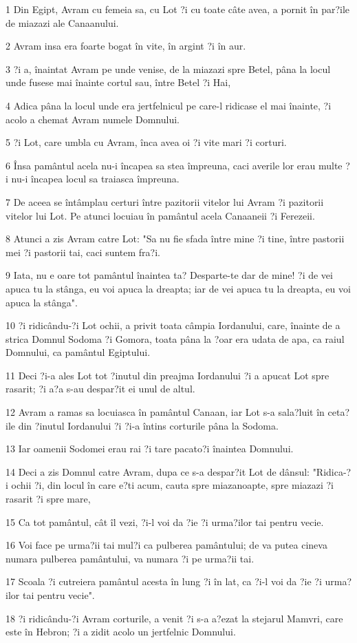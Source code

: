 \par 1 Din Egipt, Avram cu femeia sa, cu Lot ?i cu toate câte avea, a pornit în par?ile de miazazi ale Canaanului.
\par 2 Avram insa era foarte bogat în vite, în argint ?i în aur.
\par 3 ?i a, înaintat Avram pe unde venise, de la miazazi spre Betel, pâna la locul unde fusese mai înainte cortul sau, între Betel ?i Hai,
\par 4 Adica pâna la locul unde era jertfelnicul pe care-l ridicase el mai înainte, ?i acolo a chemat Avram numele Domnului.
\par 5 ?i Lot, care umbla cu Avram, înca avea oi ?i vite mari ?i corturi.
\par 6 Însa pamântul acela nu-i încapea sa stea împreuna, caci averile lor erau multe ?i nu-i încapea locul sa traiasca împreuna.
\par 7 De aceea se întâmplau certuri între pazitorii vitelor lui Avram ?i pazitorii vitelor lui Lot. Pe atunci locuiau în pamântul acela Canaaneii ?i Ferezeii.
\par 8 Atunci a zis Avram catre Lot: "Sa nu fie sfada între mine ?i tine, între pastorii mei ?i pastorii tai, caci suntem fra?i.
\par 9 Iata, nu e oare tot pamântul înaintea ta? Desparte-te dar de mine! ?i de vei apuca tu la stânga, eu voi apuca la dreapta; iar de vei apuca tu la dreapta, eu voi apuca la stânga".
\par 10 ?i ridicându-?i Lot ochii, a privit toata câmpia Iordanului, care, înainte de a strica Domnul Sodoma ?i Gomora, toata pâna la ?oar era udata de apa, ca raiul Domnului, ca pamântul Egiptului.
\par 11 Deci ?i-a ales Lot tot ?inutul din preajma Iordanului ?i a apucat Lot spre rasarit; ?i a?a s-au despar?it ei unul de altul.
\par 12 Avram a ramas sa locuiasca în pamântul Canaan, iar Lot s-a sala?luit în ceta?ile din ?inutul Iordanului ?i ?i-a întins corturile pâna la Sodoma.
\par 13 Iar oamenii Sodomei erau rai ?i tare pacato?i înaintea Domnului.
\par 14 Deci a zis Domnul catre Avram, dupa ce s-a despar?it Lot de dânsul: "Ridica-?i ochii ?i, din locul în care e?ti acum, cauta spre miazanoapte, spre miazazi ?i rasarit ?i spre mare,
\par 15 Ca tot pamântul, cât îl vezi, ?i-l voi da ?ie ?i urma?ilor tai pentru vecie.
\par 16 Voi face pe urma?ii tai mul?i ca pulberea pamântului; de va putea cineva numara pulberea pamântului, va numara ?i pe urma?ii tai.
\par 17 Scoala ?i cutreiera pamântul acesta în lung ?i în lat, ca ?i-l voi da ?ie ?i urma?ilor tai pentru vecie".
\par 18 ?i ridicându-?i Avram corturile, a venit ?i s-a a?ezat la stejarul Mamvri, care este în Hebron; ?i a zidit acolo un jertfelnic Domnului.

